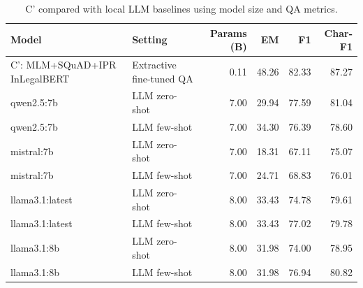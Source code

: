 \begin{table}[htbp]
\centering
\caption{C' compared with local LLM baselines using model size and QA metrics.}
\label{tab:cprime_vs_llm_efficiency}
\scriptsize
\begin{tabular}{llrrrr}
\toprule
Model & Setting & Params (B) & EM & F1 & Char-F1 \\
\midrule
C': MLM+SQuAD+IPR InLegalBERT & Extractive fine-tuned QA & 0.11 & 48.26 & 82.33 & 87.27 \\
qwen2.5:7b & LLM zero-shot & 7.00 & 29.94 & 77.59 & 81.04 \\
qwen2.5:7b & LLM few-shot & 7.00 & 34.30 & 76.39 & 78.60 \\
mistral:7b & LLM zero-shot & 7.00 & 18.31 & 67.11 & 75.07 \\
mistral:7b & LLM few-shot & 7.00 & 24.71 & 68.83 & 76.01 \\
llama3.1:latest & LLM zero-shot & 8.00 & 33.43 & 74.78 & 79.61 \\
llama3.1:latest & LLM few-shot & 8.00 & 33.43 & 77.02 & 79.78 \\
llama3.1:8b & LLM zero-shot & 8.00 & 31.98 & 74.00 & 78.95 \\
llama3.1:8b & LLM few-shot & 8.00 & 31.98 & 76.94 & 80.82 \\
\bottomrule
\end{tabular}
\end{table}
